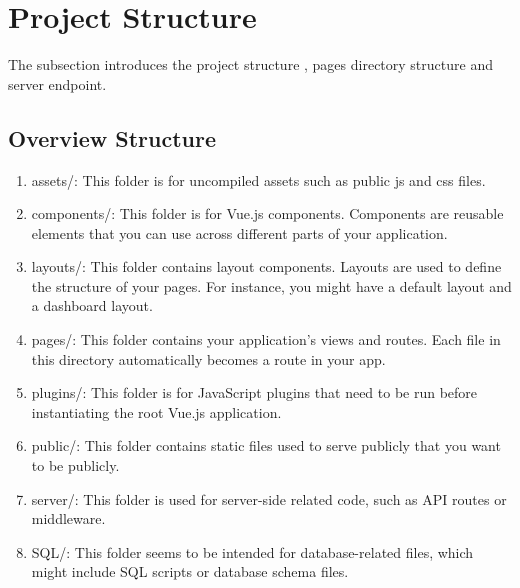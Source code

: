 
\section{Project Structure}
The subsection introduces the project structure , pages directory structure and server endpoint.
\subsection{Overview Structure}
\begin{enumerate}
	\item assets/: This folder is for uncompiled assets such as public js and css files.
	
	\item components/: This folder is for Vue.js components. Components are reusable elements that you can use across different parts of your application.
	
	\item layouts/: This folder contains layout components. Layouts are used to define the structure of your pages. For instance, you might have a default layout and a dashboard layout.
	
	\item pages/: This folder contains your application's views and routes. Each file in this directory automatically becomes a route in your app.
	
	\item plugins/: This folder is for JavaScript plugins that need to be run before instantiating the root Vue.js application.
	
	\item public/: This folder contains static files used to serve publicly that you want to be publicly.
	
	\item server/: This folder is used for server-side related code, such as API routes or middleware.
	
	\item SQL/: This folder seems to be intended for database-related files, which might include SQL scripts or database schema files.
\end{enumerate}
